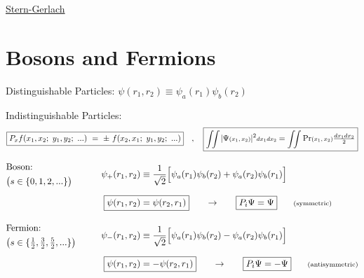 \documentclass[12pt]{article}
\newcommand{\hs}{\hspace{1pt}} %
\newcommand{\mathscriptsize}[1]{\text{\scriptsize\(#1\)}}
\newcommand{\mss}[1]{\mathscriptsize{#1}}
\begin{document}
\vspace{20pt} \noindent
\underline{Stern-Gerlach}

\newpage
\section{Bosons and Fermions}

\vspace{5pt} \noindent
Distinguishable Particles: \hspace{18pt}
\(\boxed{ \psi(r_1,r_2) \equiv \psi_a(r_1) \psi_b(r_2) }\)

\vspace{15pt} \noindent
Indistinguishable Particles:
\[
    \boxed{ P_x f(x_1, x_2; \ y_1, y_2; \ ...) \ = \ \pm \ f(x_2, x_1; \ y_1, y_2; \ ...) }
    \hspace{10pt} , \hspace{10pt} 
    \boxed{ 
        \mss{\iint} \hs | \Psi \mss{(x_1, x_2)} |^2 \mss{dx_1 dx_2} = \mss{\iint} \hs\hs \text{Pr} \mss{(x_1, x_2)} \tfrac{dx_1 dx_2}{2} 
    }
\]

\vspace{5pt} \hspace{18pt} \(\begin{aligned}
    & \begin{aligned}
            &\text{Boson:}\\
            &\big( s \in \{ 0,1,2,... \} \big)
        \end{aligned} 
        & \hspace{18pt} \psi_+(r_1,r_2) 
        & \equiv \frac{1}{\sqrt{2}} \Big[ \psi_a(r_1) \psi_b(r_2) + \psi_a(r_2) \psi_b(r_1)  \Big] 
        \\[5pt]
    && \Aboxed{ \psi(r_1,r_2) 
        & = \psi(r_2,r_1) } \hspace{18pt} \rightarrow \hspace{18pt} \boxed{P_i \Psi = \Psi} \hspace{18pt} \text{\scriptsize(symmetric)}
        \\[10pt]
    &\begin{aligned}
            &\text{Fermion:}\\
            &\big( s \in \{ \tfrac{1}{2}, \tfrac{3}{2}, \tfrac{5}{2}, ... \} \big)
        \end{aligned}
        & \hspace{18pt} \psi_-(r_1,r_2) 
        &\equiv \frac{1}{\sqrt{2}} \Big[ \psi_a(r_1) \psi_b(r_2) - \psi_a(r_2) \psi_b(r_1)\Big]\\[5pt]
        && \Aboxed{ \psi(r_1,r_2) 
        &= - \psi(r_2,r_1) }
        \hspace{18pt} \rightarrow \hspace{18pt} \boxed{P_i \Psi = - \Psi} 
        \hspace{18pt} \text{\scriptsize(antisymmetric)}
\end{aligned}\)
\end{document}
